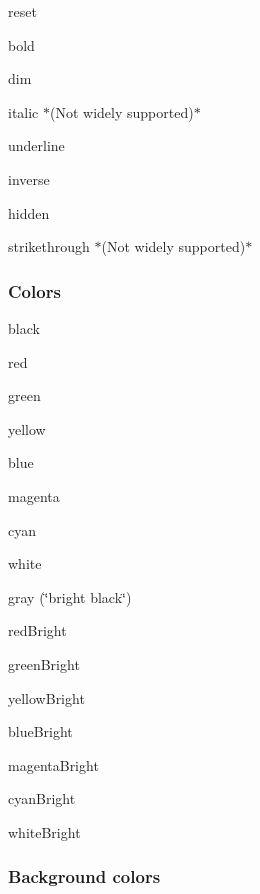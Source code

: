 \begin{DoxyItemize}
\item {\ttfamily reset}
\item {\ttfamily bold}
\item {\ttfamily dim}
\item {\ttfamily italic} $\ast$(Not widely supported)$\ast$
\item {\ttfamily underline}
\item {\ttfamily inverse}
\item {\ttfamily hidden}
\item {\ttfamily strikethrough} $\ast$(Not widely supported)$\ast$
\end{DoxyItemize}

\subsubsection*{Colors}


\begin{DoxyItemize}
\item {\ttfamily black}
\item {\ttfamily red}
\item {\ttfamily green}
\item {\ttfamily yellow}
\item {\ttfamily blue}
\item {\ttfamily magenta}
\item {\ttfamily cyan}
\item {\ttfamily white}
\item {\ttfamily gray} (\char`\"{}bright black\char`\"{})
\item {\ttfamily red\+Bright}
\item {\ttfamily green\+Bright}
\item {\ttfamily yellow\+Bright}
\item {\ttfamily blue\+Bright}
\item {\ttfamily magenta\+Bright}
\item {\ttfamily cyan\+Bright}
\item {\ttfamily white\+Bright}
\end{DoxyItemize}

\subsubsection*{Background colors}


